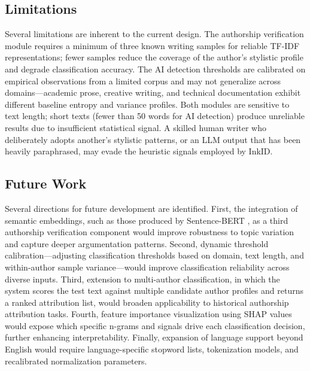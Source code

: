 \documentclass[conference]{IEEEtran}
\begin{document}
\subsection{Limitations}

Several limitations are inherent to the current design. The authorship
verification module requires a minimum of three known writing samples for
reliable TF-IDF representations; fewer samples reduce the coverage of the
author's stylistic profile and degrade classification accuracy. The AI
detection thresholds are calibrated on empirical observations from a limited
corpus and may not generalize across domains—academic prose, creative writing,
and technical documentation exhibit different baseline entropy and variance
profiles. Both modules are sensitive to text length; short texts (fewer than
50 words for AI detection) produce unreliable results due to insufficient
statistical signal. A skilled human writer who deliberately adopts another's
stylistic patterns, or an LLM output that has been heavily paraphrased, may
evade the heuristic signals employed by InkID.

\subsection{Future Work}

Several directions for future development are identified. First, the
integration of semantic embeddings, such as those produced by Sentence-BERT
\cite{reimers2019sentencebert}, as a third authorship verification component
would improve robustness to topic variation and capture deeper argumentation
patterns. Second, dynamic threshold calibration—adjusting classification
thresholds based on domain, text length, and within-author sample
variance—would improve classification reliability across diverse inputs.
Third, extension to multi-author classification, in which the system scores
the test text against multiple candidate author profiles and returns a ranked
attribution list, would broaden applicability to historical authorship
attribution tasks. Fourth, feature importance visualization using SHAP
\cite{lundberg2017shap} values would expose which specific n-grams and signals
drive each classification decision, further enhancing interpretability.
Finally, expansion of language support beyond English would require
language-specific stopword lists, tokenization models, and recalibrated
normalization parameters.

\end{document}
